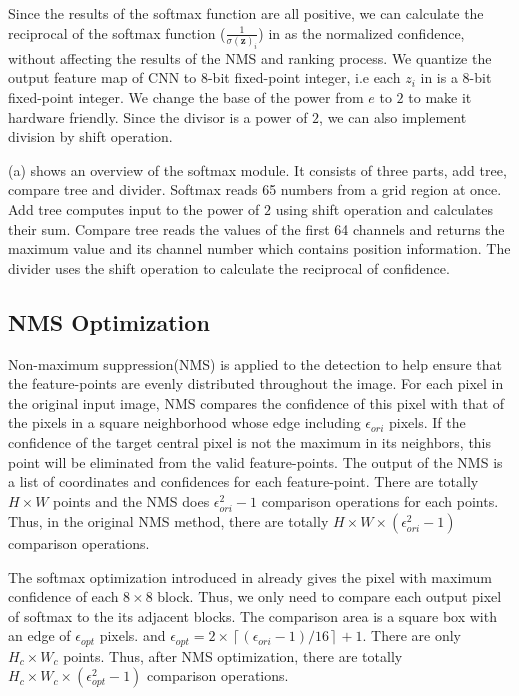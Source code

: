 Since the results of the softmax function are all positive, we can calculate the reciprocal of the softmax function ($\frac{1}{\sigma (\mathbf {z} )_{i}}$) in  as the normalized confidence, without affecting the results of the NMS and ranking process. We quantize the output feature map of CNN to 8-bit fixed-point integer, i.e each $z_i$ in  is a 8-bit fixed-point integer. We change the base of the power from $e$ to $2$ to make it hardware friendly. Since the divisor is a power of $2$, we can also implement division by shift operation.

(a) shows an overview of the softmax module. It consists of three parts, add tree, compare tree and divider. Softmax reads 65 numbers from a grid region at once. Add tree computes input to the power of $2$ using shift operation and calculates their sum. Compare tree reads the values of the first 64 channels and returns the maximum value and its channel number which contains position information. The divider uses the shift operation to calculate the reciprocal of confidence.

\subsection{NMS Optimization}

Non-maximum suppression(NMS) is applied to the detection to help ensure that the feature-points are evenly distributed throughout the image. 
For each pixel in the original input image, NMS compares the confidence of this pixel with that of the pixels in a square neighborhood whose edge including $\epsilon _{ori}$ pixels. 
If the confidence of the target central pixel is not the maximum in its neighbors, this point will be eliminated from the valid feature-points. 
The output of the NMS is a list of coordinates and confidences for each feature-point. 
There are totally $H \times W$ points and the NMS does $\epsilon _{ori} ^ 2 - 1$ comparison operations for each points. 
Thus, in the original NMS method, there are totally $H \times W \times (\epsilon _{ori} ^ 2 - 1)$ comparison operations.

The softmax optimization introduced in  already gives the pixel with maximum confidence of each $8 \times 8$ block. Thus, we only need to compare each output pixel of softmax to the its adjacent blocks. The comparison area is a square box with an edge of $\epsilon _{opt}$ pixels. and $\epsilon _{opt} = 2\times \left \lceil (\epsilon _{ori}-1)/16 \right \rceil +1$. There are only $H_c \times W_c$ points. Thus, after NMS optimization, there are totally $H_c \times W_c \times (\epsilon _{opt} ^ 2 - 1)$ comparison operations.

